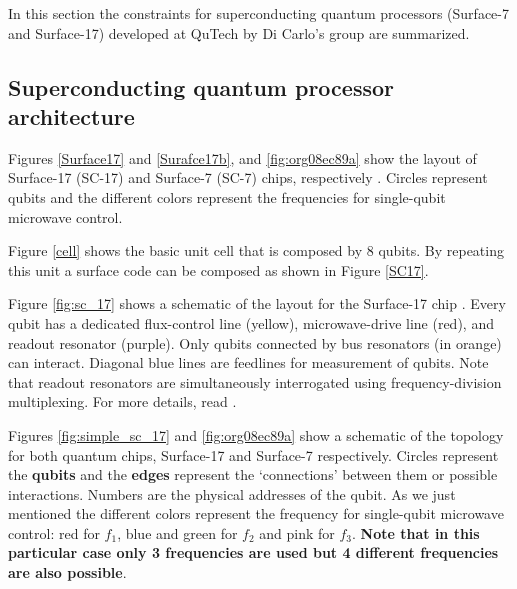 

In this section the constraints for superconducting quantum processors (Surface-7 and Surface-17) developed at QuTech by Di Carlo's group are summarized. 

\subsection*{Superconducting quantum processor architecture}
\label{sec:topology}

Figures \ref{Surface17}  and \ref{Surafce17b}, and \ref{fig:org08ec89a}  show the layout of Surface-17 (SC-17) and Surface-7 (SC-7) chips, respectively \cite{versluis2016scalable}. Circles represent qubits and the different colors represent the frequencies for single-qubit microwave control.

Figure \ref{cell} shows the basic unit cell that is composed by 8 qubits. By repeating this unit a surface code can be composed as shown in Figure \ref{SC17}. 

Figure \ref{fig:sc_17} shows a schematic of the layout for the Surface-17 chip \cite{versluis2016scalable}. Every qubit has a dedicated flux-control line (yellow), microwave-drive line (red), and readout resonator (purple). Only qubits connected by bus resonators (in orange) can interact. Diagonal blue lines are feedlines for measurement of qubits. Note that readout resonators are simultaneously interrogated using frequency-division multiplexing. For more details, read \cite{versluis2016scalable,versluis2017scalable}. 


Figures \ref{fig:simple_sc_17} and \ref{fig:org08ec89a}  show a schematic of the topology for both quantum chips, Surface-17 and Surface-7 respectively. Circles represent the \textbf{qubits}  and the \textbf{edges} represent the `connections' between them or possible interactions. Numbers  are the physical addresses of the qubit. As we just mentioned the different colors represent the frequency for single-qubit microwave control: red for $f_1$, blue and green for $f_2$ and pink for $f_3$. \textbf{Note that in this particular case only 3 frequencies are used but 4 different frequencies are also possible}.%


